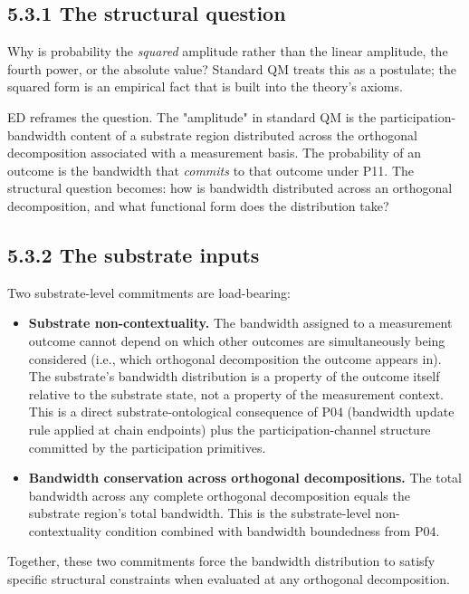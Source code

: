 \documentclass[11pt]{book}
\begin{document}
\subsection{5.3.1 The structural question}

Why is probability the \textit{squared} amplitude rather than the linear amplitude, the fourth power, or the absolute value? Standard QM treats this as a postulate; the squared form is an empirical fact that is built into the theory's axioms.

ED reframes the question. The "amplitude" in standard QM is the participation-bandwidth content of a substrate region distributed across the orthogonal decomposition associated with a measurement basis. The probability of an outcome is the bandwidth that \textit{commits} to that outcome under P11. The structural question becomes: how is bandwidth distributed across an orthogonal decomposition, and what functional form does the distribution take?

\subsection{5.3.2 The substrate inputs}

Two substrate-level commitments are load-bearing:

\begin{itemize}
\item \textbf{Substrate non-contextuality.} The bandwidth assigned to a measurement outcome cannot depend on which other outcomes are simultaneously being considered (i.e., which orthogonal decomposition the outcome appears in). The substrate's bandwidth distribution is a property of the outcome itself relative to the substrate state, not a property of the measurement context. This is a direct substrate-ontological consequence of P04 (bandwidth update rule applied at chain endpoints) plus the participation-channel structure committed by the participation primitives.
\item \textbf{Bandwidth conservation across orthogonal decompositions.} The total bandwidth across any complete orthogonal decomposition equals the substrate region's total bandwidth. This is the substrate-level non-contextuality condition combined with bandwidth boundedness from P04.
\end{itemize}

Together, these two commitments force the bandwidth distribution to satisfy specific structural constraints when evaluated at any orthogonal decomposition.
\end{document}
